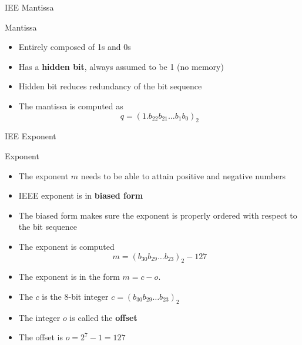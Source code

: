 \documentclass[10pt]{beamer}
\begin{document}
\begin{frame}{IEE Mantissa}
\begin{center}
\end{center}
    \begin{block}{Mantissa}
    \begin{itemize} 
        \item Entirely composed of 1s and 0s
        \item Has a \textbf{hidden bit}, always assumed to be 1 (no memory)
        \item Hidden bit reduces redundancy of the bit sequence
        \item The mantissa is computed as 
            $$ 
            q = (1.b_{22} b_{21} \ldots b_1 b_0)_{2}
            $$
        \end{itemize}
    \end{block}

\end{frame}
\begin{frame}{IEE Exponent}
\begin{center}
\end{center}

    \begin{block}{Exponent}
    \begin{itemize}   
        \item The exponent $m$ needs to be able to attain positive and negative numbers
        \item IEEE exponent is in \textbf{biased form} \\
        \item The biased form makes sure the exponent is properly ordered with respect to the bit sequence \\
        \item The exponent is computed 
        $$
            m = (b_{30} b_{29} \ldots b_{23})_2 - 127
        $$
    \end{itemize}
    \end{block}
    \begin{itemize}
        \item The exponent is in the form $m = c - o$.
        \item The $c$ is the 8-bit integer $c=(b_{30} b_{29} \ldots b_{23})_2$
        \item The integer $o$ is called the \textbf{offset} 
        \item The offset is $o = 2^{7}-1 =127$
    \end{itemize}
\end{frame}
\end{document}
